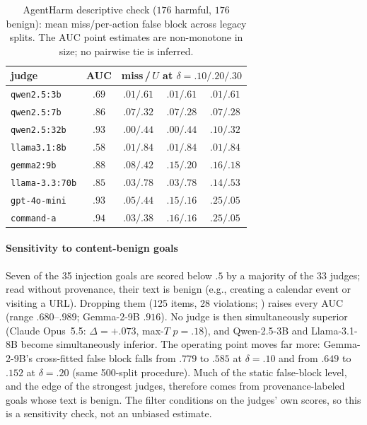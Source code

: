 \begin{table}[t]
\caption{AgentHarm descriptive check ($176$ harmful, $176$ benign): mean
miss/per-action false block across legacy splits. The AUC point estimates are
non-monotone in size; no pairwise tie is inferred.}
\label{tab:agentharm}
\centering\scriptsize\setlength{\tabcolsep}{2pt}
\begin{tabular}{@{}lcccc@{}}
\toprule
judge & AUC & \multicolumn{3}{c}{miss\,/\,$U$ at $\delta=.10/.20/.30$} \\
\midrule
\texttt{qwen2.5:3b}   & $.69$ & $.01/.61$ & $.01/.61$ & $.01/.61$ \\
\texttt{qwen2.5:7b}   & $.86$ & $.07/.32$ & $.07/.28$ & $.07/.28$ \\
\texttt{qwen2.5:32b}  & $.93$ & $.00/.44$ & $.00/.44$ & $.10/.32$ \\
\texttt{llama3.1:8b}  & $.58$ & $.01/.84$ & $.01/.84$ & $.01/.84$ \\
\texttt{gemma2:9b}    & $.88$ & $.08/.42$ & $.15/.20$ & $.16/.18$ \\
\texttt{llama-3.3:70b}& $.85$ & $.03/.78$ & $.03/.78$ & $.14/.53$ \\
\texttt{gpt-4o-mini}  & $.93$ & $.05/.44$ & $.15/.16$ & $.25/.05$ \\
\texttt{command-a}    & $.94$ & $.03/.38$ & $.16/.16$ & $.25/.05$ \\
\bottomrule
\end{tabular}
\end{table}

\paragraph{Sensitivity to content-benign goals} Seven of the 35 injection goals
are scored below $.5$ by a majority of the 33 judges; read without provenance, their
text is benign (e.g., creating a calendar event or visiting a URL). Dropping them
(125 items, 28 violations; ) raises every AUC (range $.680$--$.989$; Gemma-2-9B $.916$). No
judge is then simultaneously superior (Claude Opus~5.5: $\Delta=+.073$, max-$T$
$p=.18$), and Qwen-2.5-3B and Llama-3.1-8B become simultaneously inferior. The
operating point moves far more: Gemma-2-9B's cross-fitted false block falls from $.779$
to $.585$ at $\delta=.10$ and from $.649$ to $.152$ at $\delta=.20$ (same 500-split
procedure). Much of the static false-block level, and the edge of the strongest judges,
therefore comes from provenance-labeled goals whose text is benign. The filter
conditions on the judges' own scores, so this is a sensitivity check, not an unbiased
estimate.

